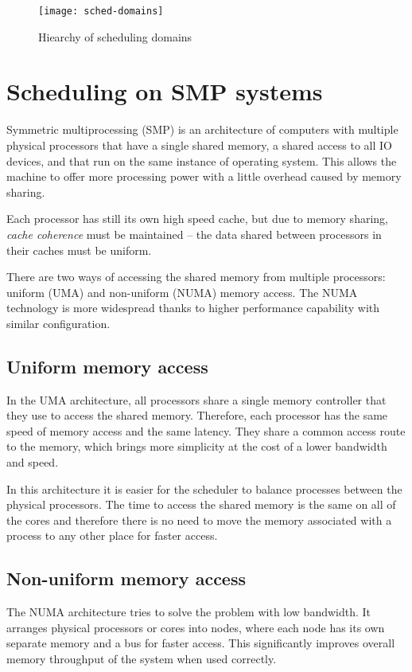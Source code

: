 \begin{figure}
  \centering
  \texttt{[image: sched-domains]}
  \caption{Hiearchy of scheduling domains\cite{sched-groups-lwn}}
  \label{fig:sched-dom}
\end{figure}

\section{Scheduling on SMP systems}
Symmetric multiprocessing (SMP) is an architecture of computers with multiple
physical processors that have a single shared memory, a shared access to all IO
devices, and that run on the same instance of operating system. This allows the
machine to offer more processing power with a little overhead caused by memory
sharing.

Each processor has still its own high speed cache, but due to memory sharing,
\emph{cache coherence} must be maintained -- the data shared between processors
in their caches must be uniform.

There are two ways of accessing the shared memory from multiple processors:
uniform (UMA) and non-uniform (NUMA) memory access. The NUMA technology is more
widespread thanks to higher performance capability with similar configuration.

\subsection{Uniform memory access}
In the UMA architecture, all processors share a single memory controller that
they use to access the shared memory. Therefore, each processor has the same
speed of memory access and the same latency. They share a common access route to
the memory, which brings more simplicity at the cost of a lower bandwidth and
speed.

In this architecture it is easier for the scheduler to balance processes
between the physical processors. The time to access the shared memory is the
same on all of the cores and therefore there is no need to move the memory
associated with a process to any other place for faster access.

\subsection{Non-uniform memory access}
The NUMA architecture tries to solve the problem with low bandwidth.
It arranges physical processors or cores into nodes, where each node has its
own separate memory and a bus for faster access. This significantly improves
overall memory throughput of the system when used correctly.

